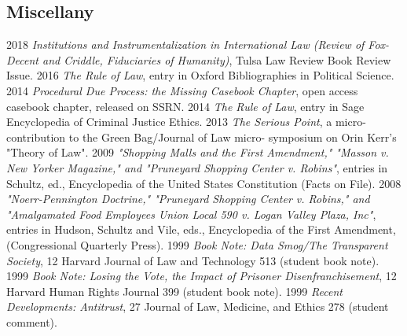 \documentclass[letterpaper]{moderncv}
\begin{document}
\subsection{Miscellany}
\cvitem
{2018}
{\textit{Institutions and Instrumentalization in International Law (Review of Fox-Decent and Criddle, Fiduciaries of Humanity)}, Tulsa Law Review Book Review Issue.}
\vspace{1mm}
\cvitem
{2016}
{\textit{The Rule of Law}, entry in Oxford Bibliographies in Political Science.}
\vspace{1mm}
\cvitem
{2014}
{\textit{Procedural Due Process: the Missing Casebook Chapter}, open access casebook chapter, released on SSRN.}
\vspace{1mm}
\cvitem
{2014}
{\textit{The Rule of Law}, entry in Sage Encyclopedia of Criminal Justice Ethics.}
\vspace{1mm}
\cvitem
{2013}
{\textit{The Serious Point}, a micro-contribution to the Green Bag/Journal of Law micro- symposium on Orin Kerr's "Theory of Law".}
\vspace{1mm}
\cvitem
{2009}
{\textit{"Shopping Malls and the First Amendment," "Masson v. New Yorker Magazine," and "Pruneyard Shopping Center v. Robins"}, entries in Schultz, ed., Encyclopedia of the United States Constitution (Facts on File).}
\vspace{1mm}
\cvitem
{2008}
{\textit{"Noerr-Pennington Doctrine," "Pruneyard Shopping Center v. Robins," and "Amalgamated Food Employees Union Local 590 v. Logan Valley Plaza, Inc"}, entries in Hudson, Schultz and Vile, eds., Encyclopedia of the First Amendment, (Congressional Quarterly Press).}
\vspace{1mm}
\cvitem
{1999}
{\textit{Book Note: Data Smog/The Transparent Society}, 12 Harvard Journal of Law and Technology 513 (student book note).}
\vspace{1mm}
\cvitem
{1999}
{\textit{Book Note: Losing the Vote, the Impact of Prisoner Disenfranchisement}, 12 Harvard Human Rights Journal 399 (student book note).}
\vspace{1mm}
\cvitem
{1999}
{\textit{Recent Developments: Antitrust}, 27 Journal of Law, Medicine, and Ethics 278 (student comment).}
\vspace{1mm}
\end{document}
